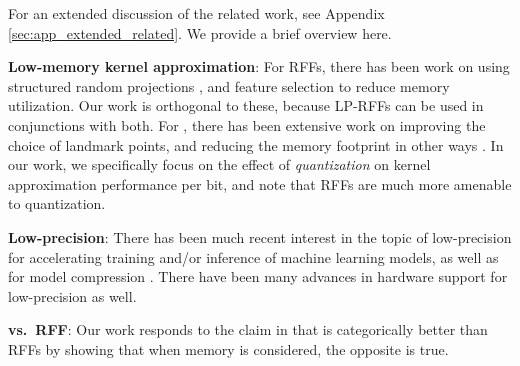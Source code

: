 For an extended discussion of the related work, see Appendix \ref{sec:app_extended_related}. We provide a brief overview here.

\textbf{Low-memory kernel approximation}: For RFFs, there has been work on using structured random projections \citep{fastfood,yu15,sphereRKS}, and feature selection \citep{sparseRKS, may2016} to reduce memory utilization. Our work is orthogonal to these, because LP-RFFs can be used in conjunctions with both. For \NystromNS, there has been extensive work on improving the choice of landmark points, and reducing the memory footprint in other ways \cite{ensemble09,fastpred14,meka14}. In our work, we specifically focus on the effect of \textit{quantization} on kernel approximation performance per bit, and note that RFFs are much more amenable to quantization. 

\textbf{Low-precision}: There has been much recent interest in the topic of low-precision for accelerating training and/or inference of machine learning models, as well as for model compression \citep{gupta15,hogwild15,hubara16,halp18,desa17,han15}.  There have been many advances in hardware support for low-precision as well\citep{tpu17,brainwave17}.

\textbf{\Nystrom vs.\ RFF}: Our work responds to the claim in \citet{nysvsrff12} that \Nystrom is categorically better than RFFs by showing that when memory is considered, the opposite is true.

